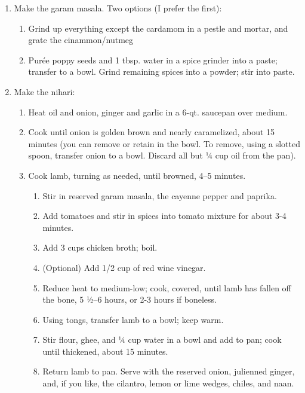 \documentclass[
]{article}
\providecommand{\tightlist}{%
  \setlength{\itemsep}{0pt}\setlength{\parskip}{0pt}}
\begin{document}
\begin{enumerate}
\def\labelenumi{\arabic{enumi}.}
\tightlist
\item
  Make the garam masala. Two options (I prefer the first):

  \begin{enumerate}
  \def\labelenumii{\arabic{enumii}.}
  \tightlist
  \item
    Grind up everything except the cardamom in a pestle and mortar, and grate the cinammon/nutmeg
  \item
    Purée poppy seeds and 1 tbsp. water in a spice grinder into a paste; transfer to a bowl. Grind remaining spices into a powder; stir into paste.
  \end{enumerate}
\item
  Make the nihari:

  \begin{enumerate}
  \def\labelenumii{\arabic{enumii}.}
  \tightlist
  \item
    Heat oil and onion, ginger and garlic in a 6-qt. saucepan over medium.
  \item
    Cook until onion is golden brown and nearly caramelized, about 15 minutes (you can remove or retain in the bowl. To remove, using a slotted spoon, transfer onion to a bowl. Discard all but 1⁄4 cup oil from the pan).
  \item
    Cook lamb, turning as needed, until browned, 4--5 minutes.

    \begin{enumerate}
    \def\labelenumiii{\arabic{enumiii}.}
    \tightlist
    \item
      Stir in reserved garam masala, the cayenne pepper and paprika.
    \item
      Add tomatoes and stir in spices into tomato mixture for about 3-4 minutes.
    \item
      Add 3 cups chicken broth; boil.
    \item
      (Optional) Add 1/2 cup of red wine vinegar.
    \item
      Reduce heat to medium-low; cook, covered, until lamb has fallen off the bone, 5 1⁄2--6 hours, or 2-3 hours if boneless.
    \item
      Using tongs, transfer lamb to a bowl; keep warm.
    \item
      Stir flour, ghee, and 1⁄4 cup water in a bowl and add to pan; cook until thickened, about 15 minutes.
    \item
      Return lamb to pan. Serve with the reserved onion, julienned ginger, and, if you like, the cilantro, lemon or lime wedges, chiles, and naan.
    \end{enumerate}
  \end{enumerate}
\end{enumerate}
\end{document}
